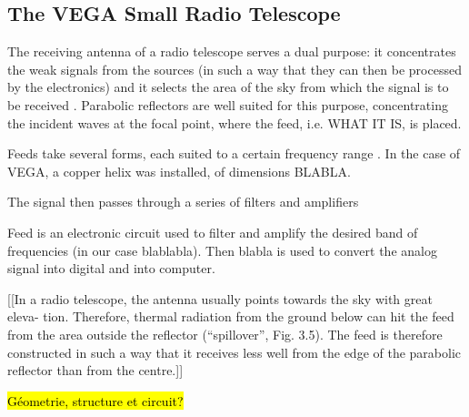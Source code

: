 \subsection{The VEGA Small Radio Telescope}

The receiving antenna of a radio telescope serves a dual purpose: it concentrates the weak signals from the sources (in such a way that they can then be processed by the electronics) and it selects the area of the sky from which the signal is to be received \cite{lauterbach_radio_2022}.
Parabolic reflectors are well suited for this purpose, concentrating the incident waves at the focal point, where the feed, i.e. WHAT IT IS, is placed.

Feeds take several forms, each suited to a certain frequency range \cite{lauterbach_radio_2022}. In the case of VEGA, a copper helix was installed, of dimensions BLABLA.

The signal then passes through a series of filters and amplifiers

Feed is an electronic circuit used to filter and amplify the desired band of frequencies (in our case blablabla).
Then blabla is used to convert the analog signal into digital and into computer.

[[In a radio telescope, the antenna usually points towards the sky with great eleva-
tion. Therefore, thermal radiation from the ground below can hit the feed from the
area outside the reflector (“spillover”, Fig. 3.5). The feed is therefore constructed
in such a way that it receives less well from the edge of the parabolic reflector than
from the centre.]]


\hl{Géometrie, structure et circuit?}
\cite{installation_manual_2022}
\cite{interdisciplinary_project_2022}

